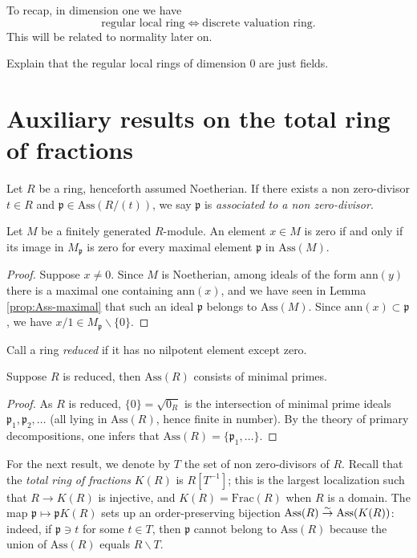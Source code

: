 To recap, in dimension one we have
\[ \text{regular local ring} \iff \text{discrete valuation ring}. \]
This will be related to normality later on.

\begin{exercise}
	Explain that the regular local rings of dimension $0$ are just fields.
\end{exercise}

\section{Auxiliary results on the total ring of fractions}
Let $R$ be a ring, henceforth assumed Noetherian. If there exists a non zero-divisor $t \in R$ and $\mathfrak{p} \in \text{Ass}(R/(t))$, we say $\mathfrak{p}$ is \emph{associated to a non zero-divisor}.

\begin{lemma}\label{prop:zero-test-ass}
	Let $M$ be a finitely generated $R$-module. An element $x \in M$ is zero if and only if its image in $M_{\mathfrak{p}}$ is zero for every maximal element $\mathfrak{p}$ in $\text{Ass}(M)$.
\end{lemma}
\begin{proof}
	Suppose $x \neq 0$. Since $M$ is Noetherian, among ideals of the form $\text{ann}(y)$ there is a maximal one containing $\text{ann}(x)$, and we have seen in Lemma \ref{prop:Ass-maximal} that such an ideal $\mathfrak{p}$ belongs to $\text{Ass}(M)$. Since $\text{ann}(x) \subset \mathfrak{p}$, we have $x/1 \in M_{\mathfrak{p}} \smallsetminus \{0\}$.
\end{proof}

Call a ring \emph{reduced} if it has no nilpotent element except zero.
\begin{lemma}
	Suppose $R$ is reduced, then $\text{Ass}(R)$ consists of minimal primes.
\end{lemma}
\begin{proof}
	As $R$ is reduced, $\{0\} = \sqrt{0_R}$ is the intersection of minimal prime ideals $\mathfrak{p}_1, \mathfrak{p}_2, \ldots$ (all lying in $\text{Ass}(R)$, hence finite in number). By the theory of primary decompositions, one infers that $\text{Ass}(R) = \{\mathfrak{p}_1, \ldots \}$.
\end{proof}

For the next result, we denote by $T$ the set of non zero-divisors of $R$. Recall that the \emph{total ring of fractions} $K(R)$ is $R[T^{-1}]$; this is the largest localization such that $R \to K(R)$ is injective, and $K(R) = \text{Frac}(R)$ when $R$ is a domain. The map $\mathfrak{p} \mapsto \mathfrak{p}K(R)$ sets up an order-preserving bijection $\text{Ass}(R) \stackrel{\sim}{\rightarrow} \text{Ass}(K(R))$: indeed, if $\mathfrak{p} \ni t$ for some $t \in T$, then $\mathfrak{p}$ cannot belong to $\text{Ass}(R)$ because the union of $\text{Ass}(R)$ equals $R \smallsetminus T$.

